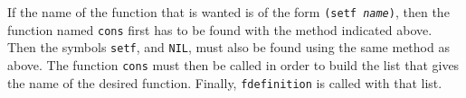 If the name of the function that is wanted is of the form
\texttt{(setf \emph{name})}, then the function named \texttt{cons}
first has to be found with the method indicated above.  Then the 
symbols \texttt{setf}, and \texttt{NIL}, must also be found using the
same method as above.  The function \texttt{cons} must then be called
in order to build the list that gives the name of the desired
function.  Finally, \texttt{fdefinition} is called with that list. 
